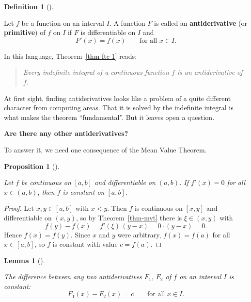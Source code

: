 \documentclass[
  letterpaper,
  DIV=11,
  numbers=noendperiod]{scrreprt}
\theoremstyle{plain}
\newtheorem{lemma}{Lemma}[chapter]
\theoremstyle{plain}
\newtheorem{proposition}{Proposition}[chapter]
\theoremstyle{definition}
\newtheorem{definition}{Definition}[chapter]
\theoremstyle{definition}
\theoremstyle{definition}
\theoremstyle{plain}
\theoremstyle{plain}
\theoremstyle{remark}
\begin{document}
\begin{definition}[]\protect\hypertarget{def-antiderivative}{}\label{def-antiderivative}

\hfill\break
Let \(f\) be a function on an interval \(I\). A function \(F\) is called
an \textbf{antiderivative} (or \textbf{primitive}) of \(f\) on \(I\) if
\(F\) is differentiable on \(I\) and \[
F'(x) = f(x) \qquad\text{for all } x\in I.
\]

\end{definition}

In this language, Theorem~\ref{thm-ftc-1} reads:

\begin{quote}
\emph{Every indefinite integral of a continuous function \(f\) is an
antiderivative of \(f\).}
\end{quote}

At first sight, finding antiderivatives looks like a problem of a quite
different character from computing areas. That it is solved by the
indefinite integral is what makes the theorem ``fundamental''. But it
leaves open a question.

\textbf{Are there any other antiderivatives?}

To answer it, we need one consequence of the Mean Value Theorem.

\begin{proposition}[]\protect\hypertarget{prp-zero-derivative-constant}{}\label{prp-zero-derivative-constant}

\hfill\break
Let \(f\) be continuous on \([a,b]\) and differentiable on \((a,b)\). If
\(f'(x)=0\) for all \(x\in(a,b)\), then \(f\) is constant on \([a,b]\).

\end{proposition}

\begin{proof}
Let \(x,y\in[a,b]\) with \(x<y\). Then \(f\) is continuous on \([x,y]\)
and differentiable on \((x,y)\), so by Theorem~\ref{thm-mvt} there is
\(\xi\in(x,y)\) with \[
f(y) - f(x) = f'(\xi)\,(y-x) = 0\cdot(y-x) = 0 .
\] Hence \(f(x)=f(y)\). Since \(x\) and \(y\) were arbitrary,
\(f(x)=f(a)\) for all \(x\in[a,b]\), so \(f\) is constant with value
\(c=f(a)\).
\end{proof}

\begin{lemma}[]\protect\hypertarget{lem-antiderivatives-differ-by-constant}{}\label{lem-antiderivatives-differ-by-constant}

\hfill\break
The difference between any two antiderivatives \(F_1\), \(F_2\) of \(f\)
on an interval \(I\) is constant: \[
F_1(x) - F_2(x) = c \qquad\text{for all } x\in I.
\]

\end{lemma}
\end{document}
